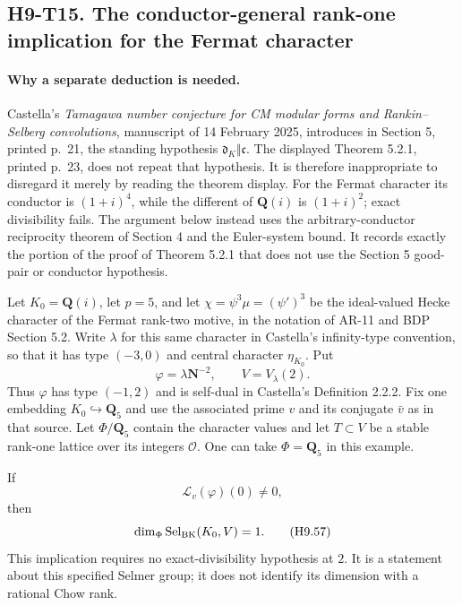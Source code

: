
\subsection*{H9-T15. The conductor-general rank-one implication for the Fermat character}

\paragraph{Why a separate deduction is needed.}
Castella's \emph{Tamagawa number conjecture for CM modular forms and
Rankin--Selberg convolutions}, manuscript of 14 February 2025,
introduces in Section 5, printed p.~21, the standing hypothesis
$\mathfrak d_K\Vert\mathfrak c$. The displayed Theorem 5.2.1,
printed p.~23, does not repeat that hypothesis. It is therefore
inappropriate to disregard it merely by reading the theorem display.
For the Fermat character its conductor is $(1+i)^4$, while the
different of $\mathbf Q(i)$ is $(1+i)^2$; exact divisibility fails.
The argument below instead uses the arbitrary-conductor reciprocity
theorem of Section 4 and the Euler-system bound. It records exactly
the portion of the proof of Theorem 5.2.1 that does not use the
Section 5 good-pair or conductor hypothesis.

\begin{proposition}[H9-T15]
Let $K_0=\mathbf Q(i)$, let $p=5$, and let
$\chi=\psi^3\mu=(\psi')^3$ be the ideal-valued Hecke character of
the Fermat rank-two motive, in the notation of AR-11 and BDP
Section 5.2. Write $\lambda$ for this same character in Castella's
infinity-type convention, so that it has type $(-3,0)$ and central
character $\eta_{K_0}$. Put
\[
 \varphi=\lambda\mathbf N^{-2},\qquad
 V=V_\lambda(2).
\]
Thus $\varphi$ has type $(-1,2)$ and is self-dual in Castella's
Definition 2.2.2. Fix one embedding $K_0\hookrightarrow\mathbf Q_5$
and use the associated prime $v$ and its conjugate $\bar v$ as in
that source. Let $\Phi/\mathbf Q_5$ contain the character values
and let $T\subset V$ be a stable rank-one lattice over its integers
$\mathcal O$. One can take $\Phi=\mathbf Q_5$ in this example.

If
\[
                  \mathcal L_v(\varphi)(0)\ne0,              \tag{H9.56}
\]
then
\[
 \dim_\Phi\operatorname{Sel}_{\rm BK}(K_0,V)=1.             \tag{H9.57}
\]
This implication requires no exact-divisibility hypothesis at $2$.
It is a statement about this specified Selmer group; it does not
identify its dimension with a rational Chow rank.
\end{proposition}

